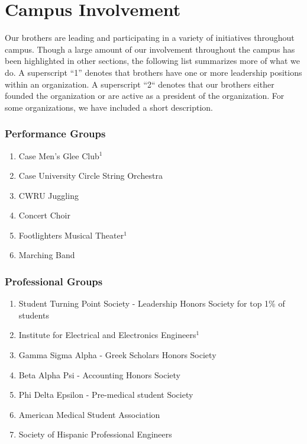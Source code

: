 \chapter{Campus Involvement}

  Our brothers are leading and participating in a variety of initiatives throughout campus. Though a large amount of our involvement throughout the campus has been highlighted in other sections, the following list summarizes more of what we do. A superscript ``1'' denotes that brothers have one or more leadership positions within an organization. A superscript ``2`` denotes that our brothers either founded the organization or are active as a president of the organization. For some organizations, we have included a short description.
    
    \subsection*{Performance Groups}
      \begin{enumerate}
      	\item Case Men's Glee Club$^1$
      	\item Case University Circle String Orchestra
      	\item CWRU Juggling
      	\item Concert Choir
      	\item Footlighters Musical Theater$^1$
      	\item Marching Band
      \end{enumerate}
      
    \subsection*{Professional Groups}
      \begin{enumerate}
      	\item Student Turning Point Society - Leadership Honors Society for top 1\% of students
      	\item Institute for Electrical and Electronics Engineers$^1$
      	\item Gamma Sigma Alpha - Greek Scholars Honors Society
      	\item Beta Alpha Psi - Accounting Honors Society
      	\item Phi Delta Epsilon - Pre-medical student Society
      	\item American Medical Student Association
      	\item Society of Hispanic Professional Engineers
      \end{enumerate}
      
